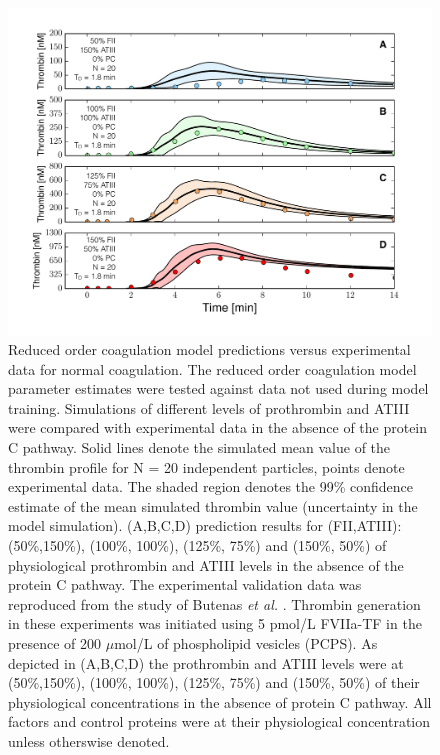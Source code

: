 \documentclass[processes,article,received,moreauthors,pdftex,12pt,a4paper]{mdpi}
\begin{document}
\begin{figure}[H]
\centering
\includegraphics[width=1.0\textwidth]{./figs/Figure-5-FII_ATIII.pdf}
\caption{Reduced order coagulation model predictions versus experimental data for normal coagulation. 
The reduced order coagulation model parameter estimates were tested against data not used during model training.
Simulations of different levels of prothrombin and ATIII were compared with experimental data in the absence of the protein C pathway. 
Solid lines denote the simulated mean value of the thrombin profile for N = 20 independent particles, points denote experimental data.
The shaded region denotes the 99\% confidence estimate of the mean simulated thrombin value (uncertainty in the model simulation). 
(A,B,C,D) prediction results for (FII,ATIII): (50\%,150\%), (100\%, 100\%), (125\%, 75\%) and (150\%, 50\%) of physiological prothrombin and ATIII levels in the absence of the protein C pathway. The experimental validation data was reproduced from the study of Butenas \textit{et al.} \citep{Butenas:1999aa}\citep{Veer:1997}.
Thrombin generation in these experiments was initiated using 5 pmol/L FVIIa-TF in the presence of 200 $\mu$mol/L of phospholipid vesicles (PCPS). 
As depicted in (A,B,C,D) the prothrombin and ATIII levels were at (50\%,150\%), (100\%, 100\%), (125\%, 75\%) and (150\%, 50\%) of their physiological concentrations in the absence of protein C pathway. All factors and control proteins were at their physiological concentration unless otherswise denoted.}\label{fig-fII_ATIII}
\end{figure}
\end{document}
